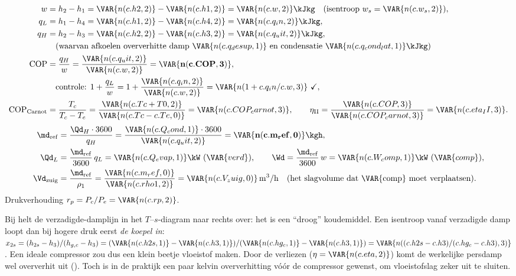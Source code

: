\begin{align*}
w &= h_2 - h_1 = \VAR{n(c.h2,2)} - \VAR{n(c.h1,2)} = \VAR{n(c.w,2)}\kJkg \quad(\text{isentroop } w_s = \VAR{n(c.w_s,2)}),\\
q_L &= h_1 - h_4 = \VAR{n(c.h1,2)} - \VAR{n(c.h4,2)} = \VAR{n(c.q_in,2)}\kJkg,\\
q_H &= h_2 - h_3 = \VAR{n(c.h2,2)} - \VAR{n(c.h3,2)} = \VAR{n(c.q_uit,2)}\kJkg,\\
 &\quad(\text{waarvan afkoelen oververhitte damp } \VAR{n(c.q_desup,1)}\text{ en condensatie } \VAR{n(c.q_cond_lat,1)}\kJkg)\\
\mathrm{COP} &= \frac{q_H}{w} = \frac{\VAR{n(c.q_uit,2)}}{\VAR{n(c.w,2)}} = \mathbf{\VAR{n(c.COP,3)}},\\
 &\quad\text{controle: } 1 + \frac{q_L}{w} = 1 + \frac{\VAR{n(c.q_in,2)}}{\VAR{n(c.w,2)}} = \VAR{n(1 + c.q_in/c.w,3)}\ \checkmark,\\
\mathrm{COP}_\mathrm{Carnot} &= \frac{T_c}{T_c - T_e} = \frac{\VAR{n(c.Tc+T0,2)}}{\VAR{n(c.Tc - c.Te,0)}} = \VAR{n(c.COP_carnot,3)},\qquad
\eta_\mathrm{II} = \frac{\VAR{n(c.COP,3)}}{\VAR{n(c.COP_carnot,3)}} = \VAR{n(c.eta_II,3)}.
\end{align*}
\begin{align*}
\md_\mathrm{ref} &= \frac{\Qd_H\cdot3600}{q_H} = \frac{\VAR{n(c.Q_cond,1)}\cdot3600}{\VAR{n(c.q_uit,2)}} = \mathbf{\VAR{n(c.m_ref,0)}\kgh},\\
\Qd_L &= \frac{\md_\mathrm{ref}}{3600}\,q_L = \VAR{n(c.Q_evap,1)}\kW\ (\VAR{verd}),\qquad
\Wd = \frac{\md_\mathrm{ref}}{3600}\,w = \VAR{n(c.W_comp,1)}\kW\ (\VAR{comp}),\\
\Vd_\mathrm{zuig} &= \frac{\md_\mathrm{ref}}{\rho_1} = \frac{\VAR{n(c.m_ref,0)}}{\VAR{n(c.rho1,2)}} = \VAR{n(c.V_zuig,0)}\,\mathrm{m^3/h}
\quad(\text{het slagvolume dat \VAR{comp} moet verplaatsen}).
\end{align*}
Drukverhouding $r_p = P_c/P_e = \VAR{n(c.rp,2)}$.

\begin{waarom}
Bij  helt de verzadigde-damplijn in het $T$–$s$-diagram naar rechts over: het is een ``droog'' koudemiddel.
Een isentroop vanaf verzadigde damp loopt dan bij hogere druk eerst \emph{de koepel in}:
$x_{2s} = (h_{2s}-h_3)/(h_{g,c}-h_3) = (\VAR{n(c.h2s,1)}-\VAR{n(c.h3,1)})/(\VAR{n(c.hg_c,1)}-\VAR{n(c.h3,1)}) = \VAR{n((c.h2s - c.h3)/(c.hg_c - c.h3),3)}$.
Een ideale compressor zou dus een klein beetje vloeistof maken. Door de verliezen ($\eta = \VAR{n(c.eta,2)}$) komt de
werkelijke persdamp wel oververhit uit (\degC). Toch is in de praktijk een paar kelvin oververhitting vóór de
compressor gewenst, om vloeistofslag zeker uit te sluiten.
\end{waarom}

